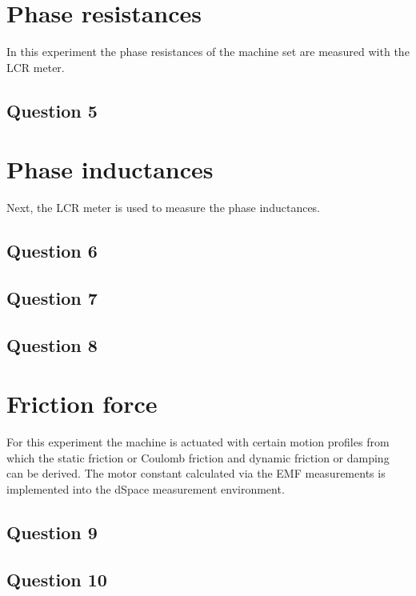 \documentclass{scrartcl}
\newcommand\tab[1][0.5cm]{\hspace*{#1}}
\begin{document}
\section{Phase resistances}
\tab In this experiment the phase resistances of the machine set are measured with the LCR meter.

	\subsection{Question 5}
    \label{3a}
    

\section{Phase inductances}
\tab Next, the LCR meter is used to measure the phase inductances.

	\subsection{Question 6}
    \label{4a}
    
    
    \subsection{Question 7}
    \label{4b} 
    

    \subsection{Question 8}
    \label{4c}
    

\section{Friction force}
\tab For this experiment the machine is actuated with certain motion profiles from which the static friction or Coulomb friction and dynamic friction or damping can be derived. The motor constant calculated via the EMF measurements is implemented into the dSpace measurement environment.

    \subsection{Question 9}
    \label{5a}
    
    
    \subsection{Question 10}
    \label{5b}
    
    
\end{document}
